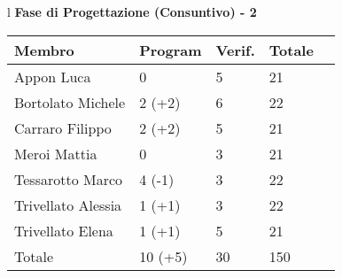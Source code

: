 \begin{table}[hbtp]
\large{
\begin{tabular}{l}
\Large{\textbf{\textsf{Fase di Progettazione (Consuntivo) - 2}}} \\
\begin{tabular}{||p{3.5cm}||p{2cm}||p{2cm}||p{2cm}||p{2cm}||}
\hline

\textbf{Membro} & \textbf{Program} & \textbf{Verif.} & \textbf{Totale}\\
\hline
{Appon Luca}&0&5&21 \\ 
\hline 
{Bortolato Michele} &2 \footnotesize{(+2)}&6&22\\ 
\hline
{Carraro Filippo}&2 \footnotesize{(+2)}&5&21 \\
\hline
{Meroi Mattia}&0&3&21\\
\hline
{Tessarotto Marco} &4 \footnotesize{(-1)}&3&22\\
\hline
{Trivellato Alessia} &1 \footnotesize{(+1)}&3&22 \\
\hline
{Trivellato Elena} &1 \footnotesize{(+1)}&5&21 \\
\hline
{Totale}&10 \footnotesize{(+5)}&30&150 \\
\hline

\end{tabular} \\
\end{tabular}
}
\end{table}


